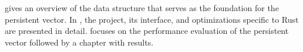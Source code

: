  gives an overview of the \treerrb{} data structure that serves as the foundation for the persistent vector. In , the \pvecrs{} project, its interface, and optimizations specific to Rust are presented in detail.  focuses on the performance evaluation of the persistent vector followed by a chapter with results.
